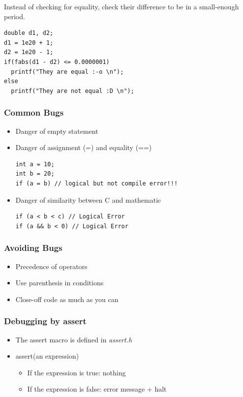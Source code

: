 \documentclass{../c-lecture}
\begin{document}
\begin{frame}[fragile]
  \begin{block}{}
    Instead of checking for equality, check their difference to be in a
    small-enough period.
  \end{block}
  \begin{verbatim}
double d1, d2;
d1 = 1e20 + 1;
d2 = 1e20 - 1;
if(fabs(d1 - d2) <= 0.0000001)
  printf("They are equal :-o \n");
else
  printf("They are not equal :D \n");
  \end{verbatim}
\end{frame}

\begin{frame}[fragile]
  \frametitle{Common Bugs}
  \begin{itemize}
    \item Danger of empty statement
    \item Danger of assignment (=) and equality (==)
    \begin{verbatim}
int a = 10;
int b = 20;
if (a = b) // logical but not compile error!!!
    \end{verbatim}
    \item Danger of similarity between C and mathematic
    \begin{verbatim}
if (a < b < c) // Logical Error
if (a && b < 0) // Logical Error
    \end{verbatim}
  \end{itemize}
\end{frame}

\begin{frame}
  \frametitle{Avoiding Bugs}
  \begin{itemize}
    \item Precedence of operators
    \item Use parenthesis in conditions
    \item Close-off code as much as you can
  \end{itemize}
\end{frame}

\begin{frame}
  \frametitle{Debugging by assert}
  \begin{itemize}
    \item
      The assert macro is defined in \textit{\color{Orange} assert.h}
    \item assert(an expression)
    \begin{itemize}
      \item If the expression is true: nothing
      \item If the expression is false: error message + halt
    \end{itemize}
  \end{itemize}
\end{frame}
\end{document}

